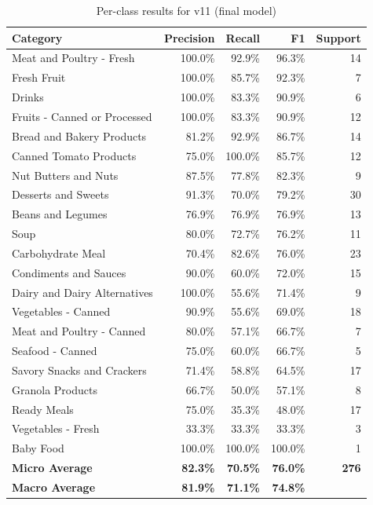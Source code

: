 \documentclass[11pt]{article}
\begin{document}
\begin{table}[h]
\centering
\caption{Per-class results for v11 (final model)}
\label{tab:perclass}
\begin{tabular}{lrrrr}
\toprule
Category & Precision & Recall & F1 & Support \\
\midrule
Meat and Poultry - Fresh & 100.0\% & 92.9\% & 96.3\% & 14 \\
Fresh Fruit & 100.0\% & 85.7\% & 92.3\% & 7 \\
Drinks & 100.0\% & 83.3\% & 90.9\% & 6 \\
Fruits - Canned or Processed & 100.0\% & 83.3\% & 90.9\% & 12 \\
Bread and Bakery Products & 81.2\% & 92.9\% & 86.7\% & 14 \\
Canned Tomato Products & 75.0\% & 100.0\% & 85.7\% & 12 \\
Nut Butters and Nuts & 87.5\% & 77.8\% & 82.3\% & 9 \\
Desserts and Sweets & 91.3\% & 70.0\% & 79.2\% & 30 \\
Beans and Legumes & 76.9\% & 76.9\% & 76.9\% & 13 \\
Soup & 80.0\% & 72.7\% & 76.2\% & 11 \\
Carbohydrate Meal & 70.4\% & 82.6\% & 76.0\% & 23 \\
Condiments and Sauces & 90.0\% & 60.0\% & 72.0\% & 15 \\
Dairy and Dairy Alternatives & 100.0\% & 55.6\% & 71.4\% & 9 \\
Vegetables - Canned & 90.9\% & 55.6\% & 69.0\% & 18 \\
Meat and Poultry - Canned & 80.0\% & 57.1\% & 66.7\% & 7 \\
Seafood - Canned & 75.0\% & 60.0\% & 66.7\% & 5 \\
Savory Snacks and Crackers & 71.4\% & 58.8\% & 64.5\% & 17 \\
Granola Products & 66.7\% & 50.0\% & 57.1\% & 8 \\
Ready Meals & 75.0\% & 35.3\% & 48.0\% & 17 \\
Vegetables - Fresh & 33.3\% & 33.3\% & 33.3\% & 3 \\
Baby Food & 100.0\% & 100.0\% & 100.0\% & 1 \\
\midrule
\textbf{Micro Average} & \textbf{82.3\%} & \textbf{70.5\%} & \textbf{76.0\%} & \textbf{276} \\
\textbf{Macro Average} & \textbf{81.9\%} & \textbf{71.1\%} & \textbf{74.8\%} & \\
\bottomrule
\end{tabular}
\end{table}
\end{document}
